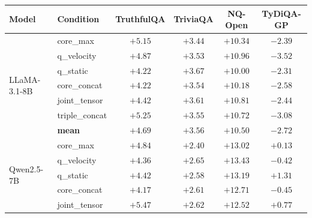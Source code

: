 \documentclass[11pt,a4paper]{article}
\begin{document}
\begin{table}[h]
\centering\small
\begin{tabular}{llcccc}
\toprule
\textbf{Model} & \textbf{Condition} & \textbf{TruthfulQA} & \textbf{TriviaQA} & \textbf{NQ-Open} & \textbf{TyDiQA-GP} \\
\midrule
\multirow{7}{*}{LLaMA-3.1-8B}
  & core\_max      & \cellcolor{gapPos!25}$+5.15$ & \cellcolor{gapPos!17}$+3.44$ & \cellcolor{gapPos!50}$+10.34$ & \cellcolor{gapNeg!12}$-2.39$ \\
  & q\_velocity    & \cellcolor{gapPos!23}$+4.87$ & \cellcolor{gapPos!17}$+3.53$ & \cellcolor{gapPos!53}$+10.96$ & \cellcolor{gapNeg!17}$-3.52$ \\
  & q\_static      & \cellcolor{gapPos!20}$+4.22$ & \cellcolor{gapPos!18}$+3.67$ & \cellcolor{gapPos!48}$+10.00$ & \cellcolor{gapNeg!11}$-2.31$ \\
  & core\_concat   & \cellcolor{gapPos!20}$+4.22$ & \cellcolor{gapPos!17}$+3.54$ & \cellcolor{gapPos!49}$+10.18$ & \cellcolor{gapNeg!12}$-2.58$ \\
  & joint\_tensor  & \cellcolor{gapPos!21}$+4.42$ & \cellcolor{gapPos!17}$+3.61$ & \cellcolor{gapPos!52}$+10.81$ & \cellcolor{gapNeg!12}$-2.44$ \\
  & triple\_concat & \cellcolor{gapPos!25}$+5.25$ & \cellcolor{gapPos!17}$+3.55$ & \cellcolor{gapPos!52}$+10.72$ & \cellcolor{gapNeg!15}$-3.08$ \\
\cmidrule(lr){2-6}
  & \textbf{mean}  & \cellcolor{gapPos!23}$\mathbf{+4.69}$ & \cellcolor{gapPos!17}$\mathbf{+3.56}$ & \cellcolor{gapPos!51}$\mathbf{+10.50}$ & \cellcolor{gapNeg!13}$\mathbf{-2.72}$ \\
\midrule
\multirow{7}{*}{Qwen2.5-7B}
  & core\_max      & \cellcolor{gapPos!23}$+4.84$ & \cellcolor{gapPos!12}$+2.40$ & \cellcolor{gapPos!63}$+13.02$ & \cellcolor{gapPos!1}$+0.13$ \\
  & q\_velocity    & \cellcolor{gapPos!21}$+4.36$ & \cellcolor{gapPos!13}$+2.65$ & \cellcolor{gapPos!65}$+13.43$ & \cellcolor{gapNeg!2}$-0.42$ \\
  & q\_static      & \cellcolor{gapPos!21}$+4.42$ & \cellcolor{gapPos!12}$+2.58$ & \cellcolor{gapPos!63}$+13.19$ & \cellcolor{gapPos!6}$+1.31$ \\
  & core\_concat   & \cellcolor{gapPos!20}$+4.17$ & \cellcolor{gapPos!13}$+2.61$ & \cellcolor{gapPos!61}$+12.71$ & \cellcolor{gapNeg!2}$-0.45$ \\
  & joint\_tensor  & \cellcolor{gapPos!26}$+5.47$ & \cellcolor{gapPos!13}$+2.62$ & \cellcolor{gapPos!60}$+12.52$ & \cellcolor{gapPos!4}$+0.77$ \\

\end{tabular}
\end{table}
\end{document}
